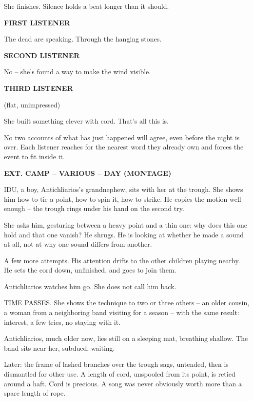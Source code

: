 \documentclass[12pt]{article}
\newcommand{\sceneheading}[1]{%
  \bigskip\noindent\textbf{#1}\par\smallskip
}
\newcommand{\action}[1]{%
  \noindent #1\par\medskip
}
\newcommand{\charcue}[1]{%
  \par\hspace*{2.2in}\textbf{#1}\par
}
\newenvironment{dialogue}{%
  \begin{list}{}{\leftmargin=1.5in\rightmargin=2in\itemsep=0pt\parsep=0pt\topsep=0pt}
  \item[]
}{%
  \end{list}\medskip
}
\newcommand{\parenthetical}[1]{%
  \hspace*{1.9in}(#1)\par
}
\begin{document}
\action{She finishes. Silence holds a beat longer than it should.}

\charcue{FIRST LISTENER}
\begin{dialogue}
The dead are speaking. Through the hanging stones.
\end{dialogue}

\charcue{SECOND LISTENER}
\begin{dialogue}
No -- she's found a way to make the wind visible.
\end{dialogue}

\charcue{THIRD LISTENER}
\begin{dialogue}
\parenthetical{flat, unimpressed}
She built something clever with cord. That's all this is.
\end{dialogue}

\action{No two accounts of what has just happened will agree, even before the night is over. Each listener reaches for the nearest word they already own and forces the event to fit inside it.}

\sceneheading{EXT. CAMP -- VARIOUS -- DAY (MONTAGE)}

\action{IDU, a boy, Antichliarios's grandnephew, sits with her at the trough. She shows him how to tie a point, how to spin it, how to strike. He copies the motion well enough -- the trough rings under his hand on the second try.}

\action{She asks him, gesturing between a heavy point and a thin one: why does this one hold and that one vanish? He shrugs. He is looking at whether he made a sound at all, not at why one sound differs from another.}

\action{A few more attempts. His attention drifts to the other children playing nearby. He sets the cord down, unfinished, and goes to join them.}

\action{Antichliarios watches him go. She does not call him back.}

\action{TIME PASSES. She shows the technique to two or three others -- an older cousin, a woman from a neighboring band visiting for a season -- with the same result: interest, a few tries, no staying with it.}

\action{Antichliarios, much older now, lies still on a sleeping mat, breathing shallow. The band sits near her, subdued, waiting.}

\action{Later: the frame of lashed branches over the trough sags, untended, then is dismantled for other use. A length of cord, unspooled from its point, is retied around a haft. Cord is precious. A song was never obviously worth more than a spare length of rope.}
\end{document}
